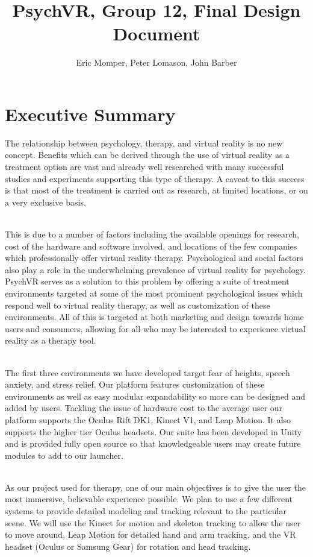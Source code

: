 \documentclass[a4paper,10pt]{article}
\title{PsychVR, Group 12, Final Design Document}
\author{Eric Momper, Peter Lomason, John Barber}
\begin{document}
	
\maketitle
	
	\pagebreak
	\tableofcontents
	\pagebreak
{}	
\section{Executive Summary}
The relationship between psychology, therapy, and virtual reality is no new concept. Benefits which can be derived through the use of virtual reality as a treatment option are vast 
and already well researched with many successful studies and experiments supporting this type of therapy. A caveat to this success is that most of the treatment is carried out as research, 
at limited locations, or on a very exclusive basis.
\par~\\ 
This is due to a number of factors including the available openings for research, cost of the hardware and software involved, and locations of the few companies which professionally offer virtual reality therapy. Psychological and social factors also play a role in the underwhelming prevalence of virtual reality for psychology.  PsychVR serves as a solution to this problem by offering a suite of treatment environments targeted at some of the most prominent psychological issues which respond well to virtual reality therapy, as well as customization of these environments.  All of this is targeted at both marketing and design towards home users and consumers, allowing for all who may be interested to experience virtual reality as a therapy tool.
\par ~\\
The first three environments we have developed target fear of heights, speech anxiety, and stress relief. Our platform features customization of these environments as well as easy modular expandability so more can be designed and added by users.  Tackling the issue of hardware cost to the average user our platform supports the Oculus Rift DK1, Kinect V1, and Leap Motion. It also supports the higher tier Oculus headsets. Our suite has been developed in Unity and is provided fully open source so that knowledgeable users may create future modules to add to our launcher.
\par ~\\
As our project  used for therapy, one of our main objectives is to give the user the most immersive, believable experience possible. We plan to use a few different systems to provide detailed modeling and tracking relevant to the particular scene. We will use the Kinect for motion and skeleton tracking to allow the user to move around, Leap Motion for detailed hand and arm tracking, and the VR headset (Oculus or Samsung Gear) for rotation and head tracking. 
\end{document}
